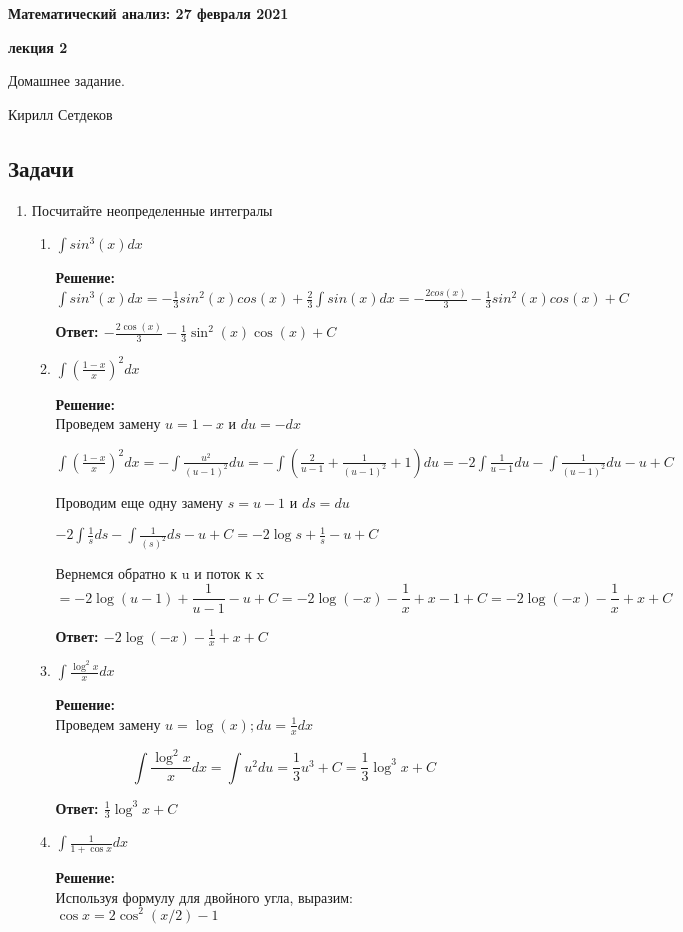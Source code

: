 \documentclass[a4paper,12pt]{article}
\newcounter{z}
\renewcommand{\date}{{\bf 27 февраля 2021}} %
\newcommand{\HSEhat}{
\vspace*{-0pt}
\noindent
\setcounter{z}{0}


{\bf \phantom{\date}  \large \hfill Математический анализ: \hfill \normalsize \date}

\vspace{5 pt}
{\bf \large \hfill  лекция 2\hfill }

\vspace{15 pt}
\centerline{ \large  Домашнее задание.}
\centerline{ \large  Кирилл Сетдеков}



\vspace*{10pt}
\setcounter{z}{0}

}
\begin{document}
\HSEhat


\subsection*{Задачи}

\begin{enumerate}

\item Посчитайте неопределенные интегралы
\begin{enumerate}
\item 
$
\int sin^3 (x) dx
$

\textbf{Решение:}\\

$
\int {sin^3 (x) }dx = -\frac{1}{3} sin^2(x) cos(x) + \frac{2}{3} \int sin(x) dx = - \frac{2 cos (x)}{3} - \frac{1}{3} sin^2(x) cos(x) + C
$

\textbf{Ответ: $- \frac{2 \cos (x)}{3} - \frac{1}{3} \sin^2(x) \cos(x) + C$}


\item
$
\int{(\frac{1-x}{x})^2 dx}
$

\textbf{Решение:}\\
Проведем замену $u = 1-x$ и $du=-dx$

$
\int{(\frac{1-x}{x})^2 dx}=-\int{\frac{u^2}{(u-1)^2}du} = -\int{(\frac{2}{u-1}+\frac{1}{(u-1)^2}+1)du} = -2\int{\frac{1}{u-1}du} - \int{\frac{1}{(u-1)^2}du} -u +C
$

Проводим еще одну замену $s= u-1$ и $ds=du$

$ -2\int{\frac{1}{s}ds} - \int{\frac{1}{(s)^2}ds} -u +C
= -2\log s + \frac{1}{s} - u +C
$

Вернемся обратно к u и поток к x
$$=-2\log(u-1) + \frac{1}{u-1} -u + C = -2\log(-x) - \frac{1}{x} +x-1+ C=-2\log(-x) - \frac{1}{x} +x+ C$$

\textbf{Ответ: $-2\log(-x) - \frac{1}{x} +x+ C$}

\item 
$
\int\frac{\log^2 x}{x} dx
$

\textbf{Решение:}\\
Проведем замену $u = \log(x); du = \frac{1}{x}dx$


$$\int\frac{\log^2 x}{x} dx
= \int u^2 du = \frac{1}{3} u^3 + C = \frac{1}{3} \log^3 x + C $$

\textbf{Ответ: $\frac{1}{3} \log^3 x + C$}

\item 
$
\int\frac{1}{1+\cos x} dx
$

\textbf{Решение:}\\
Используя формулу для двойного угла, выразим: $\cos x = 2 \cos^2 (x/2) - 1$



\end{enumerate}
\end{enumerate}
\end{document}
